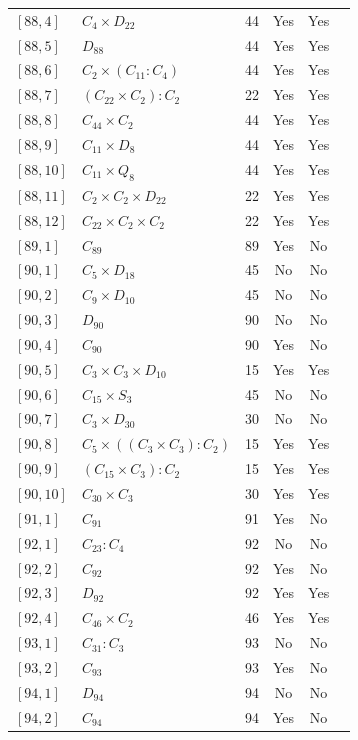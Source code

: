 \documentclass[12pt, a4paper]{article}
\theoremstyle{plain}
\theoremstyle{definition}
\begin{document}
\begin{longtable}{llcccl}
  $[88,4]$ & $C_4 \times D_{22}$ & 44 & Yes & Yes \\
  $[88,5]$ & $D_{88}$ & 44 & Yes & Yes \\
  $[88,6]$ & $C_2 \times (C_{11} : C_4)$ & 44 & Yes & Yes \\
  $[88,7]$ & $(C_{22} \times C_2) : C_2$ & 22 & Yes & Yes \\
  $[88,8]$ & $C_{44} \times C_2$ & 44 & Yes & Yes \\
  $[88,9]$ & $C_{11} \times D_8$ & 44 & Yes & Yes \\
  $[88,10]$ & $C_{11} \times Q_8$ & 44 & Yes & Yes \\
  $[88,11]$ & $C_2 \times C_2 \times D_{22}$ & 22 & Yes & Yes \\
  $[88,12]$ & $C_{22} \times C_2 \times C_2$ & 22 & Yes & Yes \\
  $[89,1]$ & $C_{89}$ & 89 & Yes & No \\
  $[90,1]$ & $C_5 \times D_{18}$ & 45 & No & No \\
  $[90,2]$ & $C_9 \times D_{10}$ & 45 & No & No \\
  $[90,3]$ & $D_{90}$ & 90 & No & No \\
  $[90,4]$ & $C_{90}$ & 90 & Yes & No \\
  $[90,5]$ & $C_3 \times C_3 \times D_{10}$ & 15 & Yes & Yes \\
  $[90,6]$ & $C_{15} \times S_3$ & 45 & No & No \\
  $[90,7]$ & $C_3 \times D_{30}$ & 30 & No & No \\
  $[90,8]$ & $C_5 \times ((C_3 \times C_3) : C_2)$ & 15 & Yes & Yes \\
  $[90,9]$ & $(C_{15} \times C_3) : C_2$ & 15 & Yes & Yes \\
  $[90,10]$ & $C_{30} \times C_3$ & 30 & Yes & Yes \\
  $[91,1]$ & $C_{91}$ & 91 & Yes & No \\
  $[92,1]$ & $C_{23} : C_4$ & 92 & No & No \\
  $[92,2]$ & $C_{92}$ & 92 & Yes & No \\
  $[92,3]$ & $D_{92}$ & 92 & Yes & Yes \\
  $[92,4]$ & $C_{46} \times C_2$ & 46 & Yes & Yes \\
  $[93,1]$ & $C_{31} : C_3$ & 93 & No & No \\
  $[93,2]$ & $C_{93}$ & 93 & Yes & No \\
  $[94,1]$ & $D_{94}$ & 94 & No & No \\
  $[94,2]$ & $C_{94}$ & 94 & Yes & No \\

\end{longtable}
\end{document}
